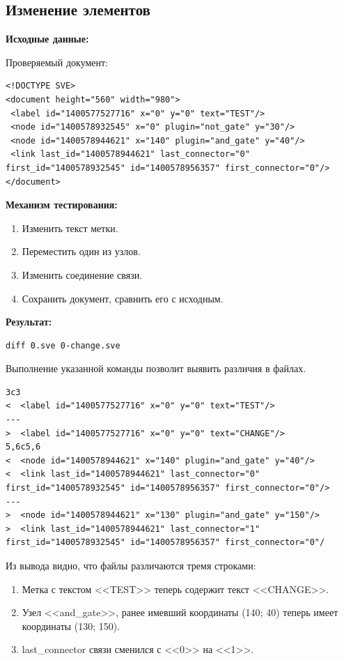 \subsection{Изменение элементов}
\textbf{Исходные данные:}

Проверяемый документ:
\begin{lstlisting}
<!DOCTYPE SVE>
<document height="560" width="980">
 <label id="1400577527716" x="0" y="0" text="TEST"/>
 <node id="1400578932545" x="0" plugin="not_gate" y="30"/>
 <node id="1400578944621" x="140" plugin="and_gate" y="40"/>
 <link last_id="1400578944621" last_connector="0" first_id="1400578932545" id="1400578956357" first_connector="0"/>
</document>
\end{lstlisting}

\textbf{Механизм тестирования:}
\begin{enumerate}
  \item Изменить текст метки.
  \item Переместить один из узлов.
  \item Изменить соединение связи.
  \item Сохранить документ, сравнить его с исходным.
\end{enumerate}

\textbf{Результат:}

\begin{lstlisting}
diff 0.sve 0-change.sve
\end{lstlisting}

Выполнение указанной команды позволит выявить различия в файлах.

\begin{lstlisting}
3c3
<  <label id="1400577527716" x="0" y="0" text="TEST"/>
---
>  <label id="1400577527716" x="0" y="0" text="CHANGE"/>
5,6c5,6
<  <node id="1400578944621" x="140" plugin="and_gate" y="40"/>
<  <link last_id="1400578944621" last_connector="0" first_id="1400578932545" id="1400578956357" first_connector="0"/>
---
>  <node id="1400578944621" x="130" plugin="and_gate" y="150"/>
>  <link last_id="1400578944621" last_connector="1" first_id="1400578932545" id="1400578956357" first_connector="0"/
\end{lstlisting}

Из вывода видно, что файлы различаются тремя строками:
\begin{enumerate}
  \item Метка с текстом <<TEST>> теперь содержит текст <<CHANGE>>.
  \item Узел <<and\_gate>>, ранее имевший координаты (140; 40) теперь имеет координаты (130; 150).
  \item last\_connector связи сменился с <<0>> на <<1>>.
\end{enumerate}

